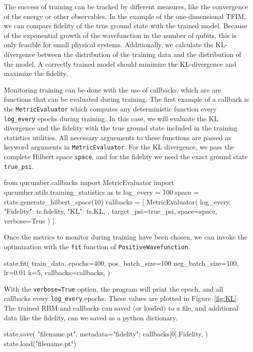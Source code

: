 \documentclass[submission, Phys]{SciPost}
\begin{document}
The success of training can be tracked by different measures, like the convergence of the energy or other observables.
In the example of the one-dimensional TFIM, we can compare fidelity of the true ground state with the trained model.
Because of the exponential growth of the wavefunction in the number of qubits, this is only feasible for small physical systems.
Additionally, we calculate the KL-divergence between the distribution of the training data and the distribution of the model.
A correctly trained model should minimize the KL-divergence and maximize the fidelity.

Monitoring training can be done with the use of callbacks, which are are functions that can be evaluated during training.
The first example of a callback is the \verb|MetricEvaluator| which computes any deterministic function every \verb|log_every| epochs during training.
 In this case, we will evaluate the KL divergence and the fidelity with the true ground state included in the training statistics utilities. 
 All necessary arguements to these functions are passed as keyword arguments in \verb|MetricEvaluator|. For the KL divergence, we pass the complete Hilbert space \verb|space|, and for the fidelity we need the exact ground state \verb|true_psi|. 
\begin{python}
from qucumber.callbacks import MetricEvaluator
import qucumber.utils.training_statistics as ts
log_every = 100
space = state.generate_hilbert_space(10)
callbacks = [
    MetricEvaluator(
        log_every,
        {
        "Fidelity": ts.fidelity, 
        "KL": ts.KL, 
        },
    target_psi=true_psi,
    space=space,
    verbose=True
    )
]
\end{python}

Once the metrics to monitor during training have been chosen, we can invoke the optimization with the \verb|fit| function of \verb|PositiveWavefunction|.


\begin{python}
state.fit(
    train_data,
    epochs=400,
    pos_batch_size=100
    neg_batch_size=100,
    lr=0.01
    k=5,
    callbacks=callbacks,
)
\end{python}

With the \verb|verbose=True| option, the program will print the epoch, and all callbacks every \verb|log_every| epochs. These values are plotted in Figure~\ref{fig:KL}. 
The trained RBM and callbacks can saved (or loaded) to a file, and additional data like the fidelity, can we saved as a python dictionary.
\begin{python}
state.save(
    "filename.pt",
    metadata={"fidelity": callbacks[0].Fidelity},
)
state.load("filename.pt")
\end{python}
\end{document}
